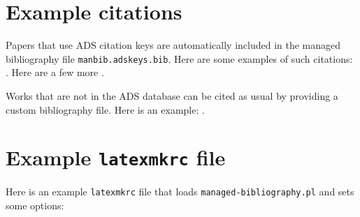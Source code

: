 \documentclass{article}
\begin{document}

\section{Example citations}
Papers that use ADS citation keys are automatically included in the managed bibliography file \texttt{manbib.adskeys.bib}.
Here are some examples of such citations:
\cite{1958ZA.....46..108B,1962AJ.....67..471K,1966AJ.....71...64K}.
Here are a few more
\cite{2002Sci...295...82K,2003PASP..115..763C}.

Works that are not in the ADS database can be cited as usual by providing a custom bibliography file. Here is an example: \cite{mcgrail2004}.


\section{Example \texttt{latexmkrc} file}
Here is an example \texttt{latexmkrc} file that loads \texttt{managed-bibliography.pl} and sets some options:






\end{document}
